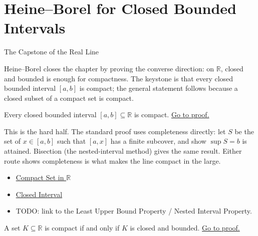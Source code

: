 \section{Heine--Borel for Closed Bounded Intervals}
\label{sec:heine-borel}

\begin{topicbox}{The Capstone of the Real Line}
\begin{exposition}
Heine--Borel closes the chapter by proving the converse direction: on $\mathbb{R}$, closed and bounded is enough for compactness. The keystone is that every closed bounded interval $[a,b]$ is compact; the general statement follows because a closed subset of a compact set is compact.
\end{exposition}
\end{topicbox}
\begin{tcolorbox}[colback=thmbox, colframe=thmborder, arc=2pt,
  left=6pt, right=6pt, top=4pt, bottom=4pt,
  title={\small\textbf{Theorem (Closed Bounded Intervals Are Compact)}},
  fonttitle=\small\bfseries]
\begin{theorem}
\label{thm:closed-bounded-interval-compact}
Every closed bounded interval $[a,b]\subseteq\mathbb{R}$ is compact.
\hyperref[prf:closed-bounded-interval-compact]{Go to proof.}
\end{theorem}
\end{tcolorbox}
\begin{remark*}[Interpretation]
This is the hard half. The standard proof uses completeness directly: let $S$ be the set of $x\in[a,b]$ such that $[a,x]$ has a finite subcover, and show $\sup S=b$ is attained. Bisection (the nested-interval method) gives the same result. Either route shows completeness is what makes the line compact in the large.
\end{remark*}
\begin{dependencies}
\begin{itemize}
  \item \hyperref[def:compact-set]{Compact Set in $\mathbb{R}$}
  \item \hyperref[def:closed-interval]{Closed Interval}
  \item TODO: link to the Least Upper Bound Property / Nested Interval Property.
\end{itemize}
\end{dependencies}
\begin{tcolorbox}[colback=thmbox, colframe=thmborder, arc=2pt,
  left=6pt, right=6pt, top=4pt, bottom=4pt,
  title={\small\textbf{Theorem (Heine--Borel Theorem for $\mathbb{R}$)}},
  fonttitle=\small\bfseries]
\begin{theorem}
\label{thm:heine-borel}
A set $K\subseteq\mathbb{R}$ is compact if and only if $K$ is closed and bounded.
\hyperref[prf:heine-borel]{Go to proof.}
\end{theorem}
\end{tcolorbox}
